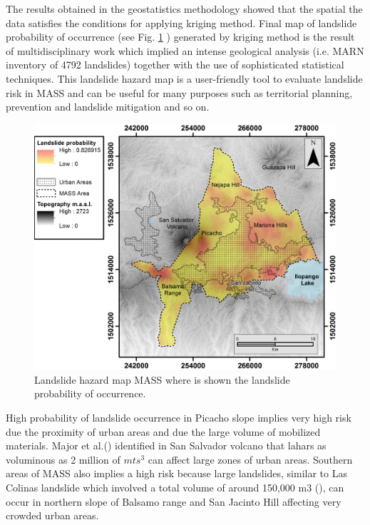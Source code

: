 \documentclass[11pt,twoside]{rmta2010esp}%
\begin{document}
The results obtained in the geostatistics methodology showed that the spatial the data satisfies the conditions for applying kriging method. Final map of landslide probability of occurrence (see Fig. \ref{fig:mass02} ) generated by kriging method is the result of multidisciplinary work which implied an intense geological analysis (i.e. MARN inventory of 4792 landslides) together with the use of sophisticated statistical techniques. This landslide hazard map is a user-friendly tool to evaluate landslide risk in MASS and can be useful for many purposes such as territorial planning, prevention and landslide mitigation and so on. 
\begin{center}
  \begin{figure}
   \centering
   \includegraphics[scale=0.70]{MASS_mapa_2}
   \caption{\small{Landslide hazard map MASS where is shown the landslide probability of occurrence.}}
   \label{fig:mass02}
  \end{figure}
 \end{center}
High probability of landslide occurrence in Picacho slope implies very high risk due the proximity of urban areas and due the large volume of mobilized materials. Major et al.(\cite{major2004}) identified in San Salvador volcano that lahars as voluminous as 2 million of $mts^{3}$ can affect large zones of urban areas. Southern areas of MASS also implies a high risk because large landslides, similar to Las Colinas landslide which involved a total volume of around 150,000 m3 (\cite{evans}), can occur in northern slope of Balsamo range and San Jacinto Hill affecting very crowded urban areas.
\end{document}
